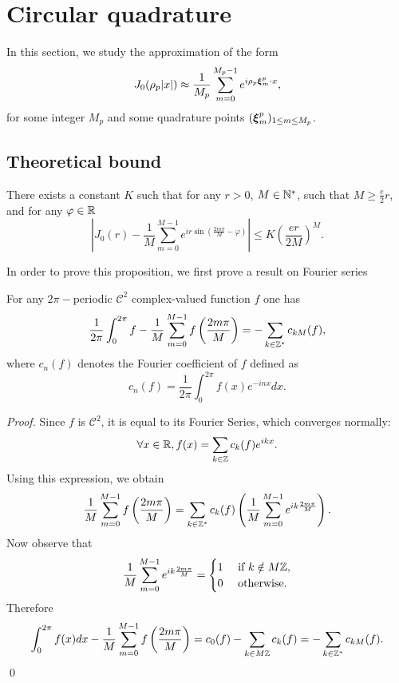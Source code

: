 \documentclass[smallextended]{svjour3}
\begin{document}
																														
\section{Circular quadrature}
\label{sec:circular}
In this section, we study the approximation of the form
\[ J_0(\rho_p|x|) \approx \dfrac{1}{M_p}\sum_{m=0}^{M_p-1}e^{i \rho_p \boldsymbol{\xi}^p_m \cdot x}, \]
for some integer $M_p$ and some quadrature points $(\boldsymbol{\xi}_m^p)_{1 \leq m \leq M_p}$. 
																														
\subsection{Theoretical bound}
\begin{theorem} There exists a constant $K$ such that for any $r>0$, $M\in \mathbb{N}^*$, such that $M \geq \frac{e}{2}r$, and for any $\varphi \in \mathbb{R}$ 
	\[\left|J_0(r) -  \dfrac{1}{M}\sum_{m=0}^{M-1}e^{ir\sin\left(\frac{2m\pi}{M}-\varphi\right)} \right| \leq K \left(\dfrac{er}{2M}\right)^M.\]
	\label{QuadratureCirc}
\end{theorem}
\noindent In order to prove this proposition, we first prove a result on Fourier series
\begin{lemma} For any $2\pi-$periodic $\mathcal{C}^2$ complex-valued function $f$ one has 
	\[\dfrac{1}{2\pi}\int_{0}^{2\pi}f - \dfrac{1}{M}\sum_{m=0}^{M-1}f\left(\frac{2m\pi}{M} \right) = - \sum\limits_{k \in \mathbb{Z}^*}c_{kM}(f),\]
	where $c_n(f)$ denotes the Fourier coefficient of $f$ defined as 
	\[c_n(f) = \dfrac{1}{2\pi}\int_{0}^{2\pi}f(x)e^{-inx}dx.\]
\end{lemma}
\begin{proof}
	Since $f$ is $\mathcal{C}^2$, it is equal to its Fourier Series, which converges normally: \[\forall x \in \mathbb{R}, f(x) = \sum_{k\in\mathbb{Z}} c_k(f)e^{ikx}.\] Using this expression, we obtain \[\dfrac{1}{M}\sum_{m=0}^{M-1}f\left(\frac{2m\pi}{M}\right) = \sum\limits_{k\in \mathbb{Z}^*}c_k(f)\left(\frac{1}{M}\sum_{m=0}^{M-1}e^{ik\frac{2m\pi}{M}}\right).\] 
	Now observe that
	\[\dfrac{1}{M}\sum_{m=0}^{M-1}e^{ik\frac{2m\pi}{M}} =   \begin{cases}
	1 &\text{ if } k \notin M\mathbb{Z}, \\
	0 &\text{ otherwise.}
	\end{cases}\] 
	Therefore \[\int_{0}^{2\pi}f(x)dx - \dfrac{1}{M}\sum_{m=0}^{M-1}f\left(\frac{2m\pi}{M} \right) = c_0(f) - \sum\limits_{k \in M\mathbb{Z}}c_{k}(f) = - \sum\limits_{k \in \mathbb{Z}^*}c_{kM}(f).\]
	\qed
\end{proof}
\end{document}
